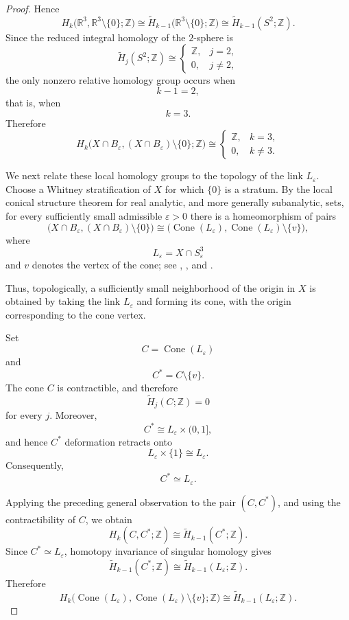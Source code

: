 \documentclass[11pt]{amsart}
\theoremstyle{definition}
\theoremstyle{remark}
\begin{document}
\begin{proof}
Hence
\[
H_k\bigl(
\mathbb R^3,
\mathbb R^3\setminus\{0\};
\mathbb Z
\bigr)
\cong
\widetilde H_{k-1}\bigl(
\mathbb R^3\setminus\{0\};
\mathbb Z
\bigr)
\cong
\widetilde H_{k-1}(S^2;\mathbb Z).
\]
Since the reduced integral homology of the \(2\)-sphere is
\[
\widetilde H_j(S^2;\mathbb Z)
\cong
\begin{cases}
\mathbb Z, & j=2,\\
0, & j\ne2,
\end{cases}
\]
the only nonzero relative homology group occurs when
\[
k-1=2,
\]
that is, when
\[
k=3.
\]
Therefore
\[
H_k\bigl(
X\cap B_\varepsilon,
(X\cap B_\varepsilon)\setminus\{0\};
\mathbb Z
\bigr)
\cong
\begin{cases}
\mathbb Z, & k=3,\\
0, & k\ne3.
\end{cases}
\tag{3.1}
\]

We next relate these local homology groups to the topology of the link
\(L_\varepsilon\). Choose a Whitney stratification of \(X\) for which
\(\{0\}\) is a stratum. By the local conical structure theorem for real
analytic, and more generally subanalytic, sets, for every sufficiently small
admissible \(\varepsilon>0\) there is a homeomorphism of pairs
\[
\bigl(
X\cap B_\varepsilon,
(X\cap B_\varepsilon)\setminus\{0\}
\bigr)
\cong
\bigl(
\operatorname{Cone}(L_\varepsilon),
\operatorname{Cone}(L_\varepsilon)\setminus\{v\}
\bigr),
\]
where
\[
L_\varepsilon=X\cap S^3_\varepsilon
\]
and \(v\) denotes the vertex of the cone; see
\cite{Lojasiewicz1964},
\cite[Sec.~9.3]{BochnakCosteRoy1998}, and
\cite{BurgheleaVerona1972}.

Thus, topologically, a sufficiently small neighborhood of the origin in
\(X\) is obtained by taking the link \(L_\varepsilon\) and forming its cone,
with the origin corresponding to the cone vertex.

Set
\[
C=\operatorname{Cone}(L_\varepsilon)
\]
and
\[
C^\ast=C\setminus\{v\}.
\]
The cone \(C\) is contractible, and therefore
\[
\widetilde H_j(C;\mathbb Z)=0
\]
for every \(j\). Moreover,
\[
C^\ast\cong L_\varepsilon\times(0,1],
\]
and hence \(C^\ast\) deformation retracts onto
\[
L_\varepsilon\times\{1\}\cong L_\varepsilon.
\]
Consequently,
\[
C^\ast\simeq L_\varepsilon.
\]

Applying the preceding general observation to the pair \((C,C^\ast)\), and
using the contractibility of \(C\), we obtain
\[
H_k(C,C^\ast;\mathbb Z)
\cong
\widetilde H_{k-1}(C^\ast;\mathbb Z).
\]
Since \(C^\ast\simeq L_\varepsilon\), homotopy invariance of singular
homology gives
\[
\widetilde H_{k-1}(C^\ast;\mathbb Z)
\cong
\widetilde H_{k-1}(L_\varepsilon;\mathbb Z).
\]
Therefore
\[
H_k\bigl(
\operatorname{Cone}(L_\varepsilon),
\operatorname{Cone}(L_\varepsilon)\setminus\{v\};
\mathbb Z
\bigr)
\cong
\widetilde H_{k-1}(L_\varepsilon;\mathbb Z).
\tag{3.2}
\]


\end{proof}
\end{document}
